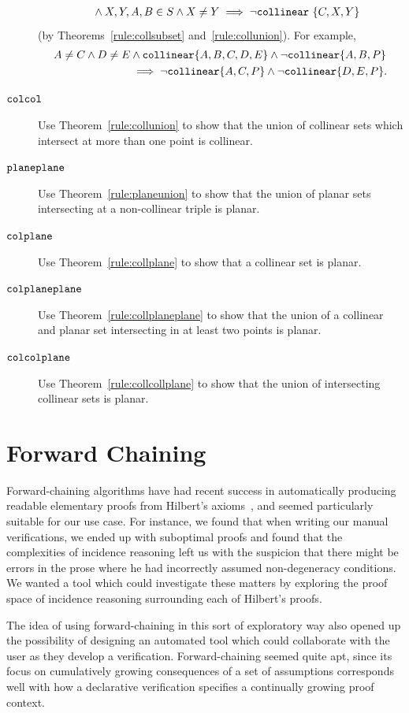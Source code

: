 \begin{description}
\begin{align*}
  &\qquad\wedge X,Y,A,B \in S \wedge X \neq Y\implies \neg\texttt{collinear}\ \{C,X,Y\}
\end{align*} (by Theorems~\ref{rule:collsubset} and~\ref{rule:collunion}). For example,
\begin{align*}
A \neq C \wedge D \neq E &\wedge \texttt{collinear} \{A, B, C, D, E\} \wedge \neg\texttt{collinear} \{A, B, P\}\\
&\implies \neg\texttt{collinear} \{A, C, P\} \wedge \neg\texttt{collinear} \{D, E, P\}.
\end{align*}
\item[$\texttt{colcol}$] Use Theorem~\ref{rule:collunion} to show that the union of collinear sets which intersect at more than one point is collinear.
\item[$\texttt{planeplane}$] Use Theorem~\ref{rule:planeunion} to show that the union of planar sets intersecting at a non-collinear triple is planar.
\item[$\texttt{colplane}$] Use Theorem~\ref{rule:collplane} to show that a collinear set is planar.
\item[$\texttt{colplaneplane}$] Use Theorem~\ref{rule:collplaneplane} to show that the union of a collinear and planar set intersecting in at least two points is planar.
\item[$\texttt{colcolplane}$] Use Theorem~\ref{rule:collcollplane} to show that the union of intersecting collinear sets is planar.
\end{description}

\section{Forward Chaining}\label{sec:Forward-chaining}
Forward-chaining algorithms have had recent success in automatically producing readable elementary proofs from Hilbert's axioms~\cite{ForwardChainHilbert}, and seemed particularly suitable for our use case. For instance, we found that when writing our manual verifications, we ended up with suboptimal proofs and found that the complexities of incidence reasoning left us with the suspicion that there might be errors in the prose where he had incorrectly assumed non-degeneracy conditions. We wanted a tool which could investigate these matters by exploring the proof space of incidence reasoning surrounding each of Hilbert's proofs. 

The idea of using forward-chaining in this sort of exploratory way also opened up the possibility of designing an automated tool which could collaborate with the user as they develop a verification. Forward-chaining seemed quite apt, since its focus on cumulatively growing consequences of a set of assumptions corresponds well with how a declarative verification specifies a continually growing proof context. 

